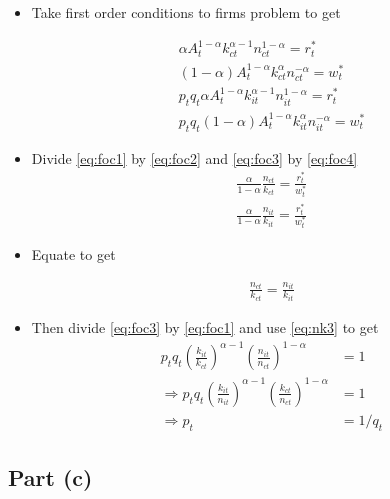 \documentclass{scrartcl}
\begin{document}
\begin{itemize}
	\item Take first order conditions to firms problem to get
	
	\begin{align}
	\alpha A_t ^{1-\alpha} k_{ct}^{\alpha-1} n_{ct}^{1-\alpha}=r_t^* \label{eq:foc1} \\
	(1-\alpha) A_t ^{1-\alpha} k_{ct}^{\alpha} n_{ct}^{-\alpha}=w_t^* \label{eq:foc2} \\
	p_t q_t \alpha A_t ^{1-\alpha} k_{it}^{\alpha-1} n_{it}^{1-\alpha}=r_t^* \label{eq:foc3} \\
	p_t q_t (1-\alpha) A_t ^{1-\alpha} k_{it}^{\alpha} n_{it}^{-\alpha}=w_t^* \label{eq:foc4}
	\end{align}
	
	\item Divide \eqref{eq:foc1} by \eqref{eq:foc2} and \eqref{eq:foc3} by \eqref{eq:foc4} 
	\begin{align}
	\frac{\alpha}{1-\alpha}\frac{n_{ct}}{k_{ct}}=\frac{r^*_t}{w^*_t} \label{eq:nk1} \\
	\frac{\alpha}{1-\alpha}\frac{n_{it}}{k_{it}}=\frac{r^*_t}{w^*_t} \label{eq:nk2}
	\end{align}
	
	\item Equate to get
	
	\begin{align}
	\frac{n_{ct}}{k_{ct}}=\frac{n_{it}}{k_{it}} \label{eq:nk3}
	\end{align}
	
	\item Then divide \eqref{eq:foc3} by \eqref{eq:foc1} and use \eqref{eq:nk3} to get
	\begin{align}
	p_t q_t \left(\frac{k_{it}}{k_{ct}}\right)^{\alpha-1} \left(\frac{n_{it}}{n_{ct}}\right)^{1-\alpha}&=1 \nonumber \\
	\Rightarrow p_t q_t \left( \frac{k_{it}}{n_{it}}\right)^{\alpha-1} \left( \frac{k_{ct}}{n_{ct}}\right)^{1-\alpha}&=1 \nonumber \\
	\Rightarrow p_t &= 1/q_t \label{eq:pq}
	\end{align}

	
\end{itemize}

\subsection*{Part (c)}
\end{document}
